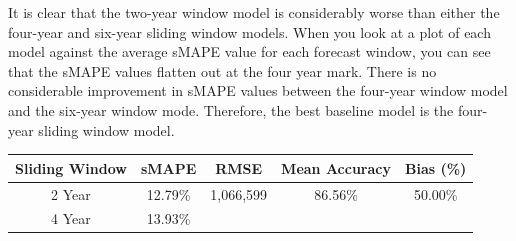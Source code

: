 \documentclass[12pt,oneside]{chicagocapstone}
\begin{document}
It is clear that the two-year window model is considerably worse than
either the four-year and six-year sliding window models. When you look
at a plot of each model against the average sMAPE value for each
forecast window, you can see that the sMAPE values flatten out at the
four year mark. There is no considerable improvement in sMAPE values
between the four-year window model and the six-year window mode.
Therefore, the best baseline model is the four-year sliding window
model.
\begin{longtable}[]{@{}ccccc@{}}
\toprule
\begin{minipage}[b]{0.22\columnwidth}\centering\strut
Sliding Window\strut
\end{minipage} & \begin{minipage}[b]{0.16\columnwidth}\centering\strut
sMAPE\strut
\end{minipage} & \begin{minipage}[b]{0.15\columnwidth}\centering\strut
RMSE\strut
\end{minipage} & \begin{minipage}[b]{0.16\columnwidth}\centering\strut
Mean Accuracy\strut
\end{minipage} & \begin{minipage}[b]{0.16\columnwidth}\centering\strut
Bias (\%)\strut
\end{minipage}\tabularnewline
\midrule
\endhead
\begin{minipage}[t]{0.22\columnwidth}\centering\strut
2 Year\strut
\end{minipage} & \begin{minipage}[t]{0.16\columnwidth}\centering\strut
12.79\%\strut
\end{minipage} & \begin{minipage}[t]{0.15\columnwidth}\centering\strut
1,066,599\strut
\end{minipage} & \begin{minipage}[t]{0.16\columnwidth}\centering\strut
86.56\%\strut
\end{minipage} & \begin{minipage}[t]{0.16\columnwidth}\centering\strut
50.00\%\strut
\end{minipage}\tabularnewline
\begin{minipage}[t]{0.22\columnwidth}\centering\strut
4 Year\strut
\end{minipage} & \begin{minipage}[t]{0.16\columnwidth}\centering\strut
13.93\%\strut
\end{minipage} & \begin{minipage}[t]{0.15\columnwidth}\centering\strut

\end{minipage}
\end{longtable}
\end{document}
